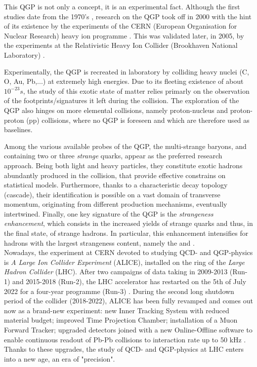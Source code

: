 This QGP is not only a concept, it is an experimental fact. Although the first studies date from the 1970's \cite{carruthersQuarkiumBizarreFermi1974}\cite{harringtonHighDensityPhaseTransitions1974}\cite{collinsSuperdenseMatterNeutrons1975}, research on the QGP took off in 2000 with the hint of its existence by the experiments of the CERN (European Organisation for Nuclear Research) heavy ion programme \cite{NewStateMatter2023}. This was validated later, in 2005, by the experiments at the Relativistic Heavy Ion Collider (Brookhaven National Laboratory) \cite{ludlamHUNTINGQUARKGLUON2005}\cite{arseneQuarkGluonPlasma2005}\cite{alPHOBOSPerspectiveDiscoveries2005}\cite{phenixcollaborationFormationDensePartonic2005}\cite{starcollaborationExperimentalTheoreticalChallenges2005}.

Experimentally, the QGP is recreated in laboratory by colliding heavy nuclei (C, O, Au, Pb,...) at extremely high energies. Due to its fleeting existence of about $10^{-23} s$, the study of this exotic state of matter relies primarly on the observation of the footprints/signatures it left during the collision. The exploration of the QGP also hinges on more elemental collisions, namely proton-nucleus and proton-proton (pp) collisions, where no QGP is foreseen and which are therefore used as baselines. 

Among the various available probes of the QGP, the multi-strange baryons, \rmXi and \rmOmega containing two or three \textit{strange} quarks, appear as the preferred research approach. Being both light and heavy particles, they constitute exotic hadrons abundantly produced in the collision, that provide effective constrains on statistical models. Furthermore, thanks to a characteristic decay topology (cascade), their identification is possible on a vast domain of transverse momentum, originating from different production mechanisms, eventually intertwined. Finally, one key signature of the QGP is the \textit{strangeness enhancement}, which consists in the increased yields of strange quarks and thus, in the final state, of strange hadrons. In particular, this enhancement intensifies for hadrons with the largest strangeness content, namely the \rmXi and \rmOmega.\\

Nowadays, the experiment at CERN devoted to studying QCD- and QGP-physics is \textit{A Large Ion Collider Experiment} (ALICE), installed on the ring of the \textit{Large Hadron Collider} (LHC). After two campaigns of data taking in 2009-2013 (Run-1) and 2015-2018 (Run-2), the LHC accelerator has restarted on the 5th of July 2022 for a four-year programme (Run-3) \cite{ThirdRunLarge2023}. During the second long shutdown period of the collider (2018-2022), ALICE has been fully revamped and comes out now as a brand-new experiment: new Inner Tracking System with reduced material budget; improved Time Projection Chamber; installation of a Muon Forward Tracker; upgraded detectors joined with a new Online-Offline software to enable continuous readout of Pb-Pb collisions to interaction rate up to 50 kHz \cite{alicecollaborationUpgradeALICEExperiment2014}. Thanks to these upgrades, the study of QCD- and QGP-physics at LHC enters into a new age, an era of "precision".

